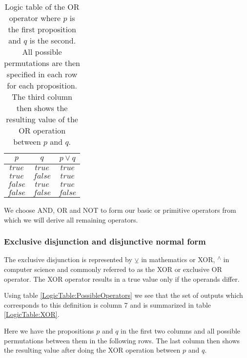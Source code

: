                 \begin{table}[h!]
                    \centering
                    \begin{tabular}{|c|c|c|}
                    	\hline
                    	  $p$   &   $q$   & $p \vee q$ \\ \hline
                    	$true$  & $true$  &   $true$   \\ \hline
                    	$true$  & $false$ &   $true$   \\ \hline
                    	$false$ & $true$  &   $true$   \\ \hline
                    	$false$ & $false$ &  $false$   \\ \hline
                    \end{tabular}
                    \caption{Logic table of the OR operator where $p$ is the first proposition and $q$ is the second. All possible permutations are then specified in each row for each proposition. The third column then shows the resulting value of the OR operation between $p$ and $q$.}
                    \label{LogicTable:OR}
                \end{table}
            
                We choose AND, OR and NOT to form our basic or primitive operators from which we will derive all remaining operators.
                
            \subsubsection{Exclusive disjunction and disjunctive normal form}
                
                The exclusive disjunction is represented by $\veebar$ in mathematics or XOR, \textsuperscript{$\wedge$} in computer science and commonly referred to as the XOR or exclusive OR operator. The XOR operator results in a true value only if the operands differ.
                
                Using table \ref{LogicTable:PossibleOperators} we see that the set of outputs which corresponds to this definition is column 7 and is summarized in table \ref{LogicTable:XOR}.
                
                Here we have the propositions $p$ and $q$ in the first two columns and all possible permutations between them in the following rows. The last column then shows the resulting value after doing the XOR operation between $p$ and $q$.
                
